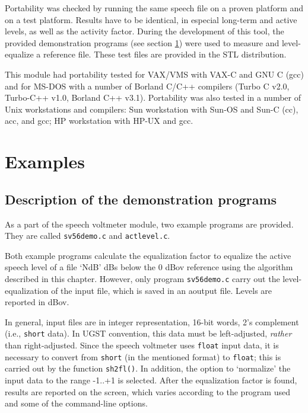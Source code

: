 Portability was checked by running the same speech file on a proven
platform and on a test platform. Results have to be identical, in
especial long-term and active levels, as well as the activity factor.
During the development of this tool, the provided demonstration programs (see
section \ref{sv56-examples}) were used to  measure and level-equalize
a reference file. These test files are provided in the STL
distribution.

This module had portability tested for VAX/VMS with VAX-C and GNU C
(gcc) and for MS-DOS with a number of Borland C/C++ compilers (Turbo
C v2.0, Turbo-C++ v1.0, Borland C++ v3.1). Portability was also
tested in a number of Unix workstations and compilers: Sun
workstation with Sun-OS and Sun-C (cc), acc, and gcc; HP workstation
with HP-UX and gcc.

\section {Examples} \label{sv56-examples}

\subsection {Description of the demonstration programs} 

As a part of the speech voltmeter module, two example programs
are provided. They are called {\tt sv56demo.c} and {\tt actlevel.c}.

Both example programs calculate the equalization factor to equalize
the active speech level of a file `NdB' dBs below the 0 dBov
reference using the algorithm described in this chapter. However,
only program {\tt sv56demo.c} carry out the level-equalization of the
input file, which is saved in an aoutput file. Levels are reported in
dBov.

In general, input files are in integer representation, 16-bit words,
2's complement (i.e., {\tt short} data). In UGST convention, this
data must be left-adjusted, {\em rather} than right-adjusted. Since
the speech voltmeter uses {\tt float} input data, it is necessary to
convert from {\tt short} (in the mentioned format) to {\tt float};
this is carried out by the function {\tt sh2fl()}. In addition, the
option to `normalize' the input data to the range -1..+1 is selected.
After the equalization factor is found, results are reported on the
screen, which varies according to the program used and some of the
command-line options. 

